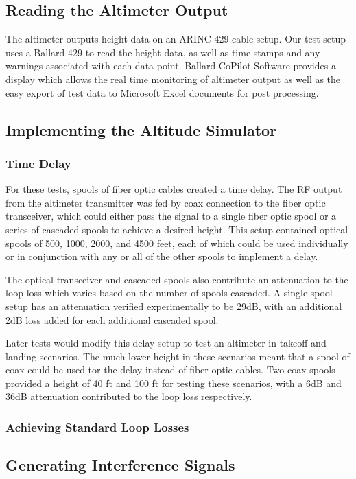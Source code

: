 \subsection{Reading the Altimeter Output}
The altimeter outputs height data on an ARINC 429 cable setup. Our test setup uses a Ballard 429 to read the height data, as well as time stamps and any warnings associated with each data point. Ballard CoPilot Software provides a display which allows the real time monitoring of altimeter output as well as the easy export of test data to Microsoft Excel documents for post processing. 
\subsection{Implementing the Altitude Simulator}
\subsubsection{Time Delay}
For these tests, spools of fiber optic cables created a time delay. The RF output from the altimeter transmitter was fed by coax connection to the fiber optic transceiver, which could either pass the signal to a single fiber optic spool or a series of cascaded spools to achieve a desired height. This setup contained optical spools of 500, 1000, 2000, and 4500 feet, each of which could be used individually or in conjunction with any or all of the other spools to implement a delay.

 The optical transceiver and cascaded spools also contribute an attenuation to the loop loss which varies based on the number of spools cascaded. A single spool setup has an attenuation verified experimentally to be 29dB, with an additional 2dB loss added for each additional cascaded spool.

Later tests would modify this delay setup to test an altimeter in takeoff and landing scenarios. The much lower height in these scenarios meant that a spool of coax could be used tor the delay instead of fiber optic cables. Two coax spools provided a height of 40 ft and 100 ft for testing these scenarios, with a 6dB and 36dB attenuation contributed to the loop loss respectively.  

\subsubsection{Achieving Standard Loop Losses}



\subsection{Generating Interference Signals}

